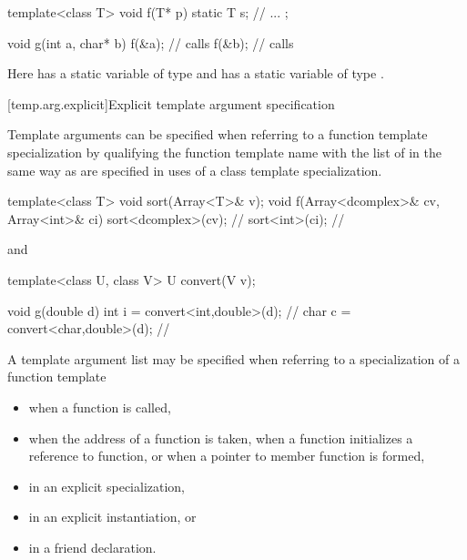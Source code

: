 \begin{codeblock}
template<class T> void f(T* p)
{
	static T s;
	// ...
};

void g(int a, char* b)
{
	f(&a);			// calls 
	f(&b);			// calls 
}
\end{codeblock}

Here
has a static variable
of type
and
has a static variable
of type
.
\exitexample

[temp.arg.explicit]{Explicit template argument specification}

\pnum
{}%
Template arguments can be specified when referring to a function
template specialization by qualifying the function template
name with the list of
in the same way as
are specified in uses of a class template specialization.
\enterexample

\begin{codeblock}
template<class T> void sort(Array<T>& v);
void f(Array<dcomplex>& cv, Array<int>& ci)
{
	sort<dcomplex>(cv);     // 
	sort<int>(ci);          // 
}
\end{codeblock}

and

\begin{codeblock}
template<class U, class V> U convert(V v);

void g(double d)
{
	int i = convert<int,double>(d);		// 
	char c = convert<char,double>(d);	// 
}
\end{codeblock}
\exitexampleb

\pnum
A template argument list may be specified when referring to a specialization
of a function template

\begin{itemize}
\item
when a function is called,
\item
when the address of a function is taken, when a function initializes a
reference to function, or when a pointer to member function is formed,
\item
in an explicit specialization,
\item
in an explicit instantiation, or
\item
in a friend declaration.
\end{itemize}

